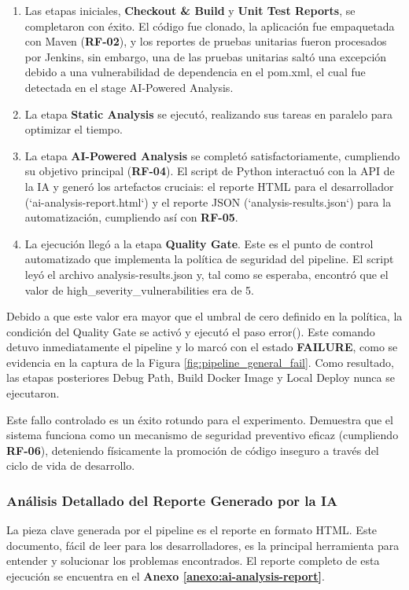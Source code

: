 \begin{enumerate}
    \item Las etapas iniciales, \textbf{Checkout \& Build} y \textbf{Unit Test Reports}, se completaron con éxito. El código fue clonado, la aplicación fue empaquetada con Maven (\textbf{RF-02}), y los reportes de pruebas unitarias fueron procesados por Jenkins, sin embargo, una de las pruebas unitarias saltó una excepción debido a una vulnerabilidad de dependencia en el pom.xml, el cual fue detectada en el stage AI-Powered Analysis.
    \item La etapa \textbf{Static Analysis} se ejecutó, realizando sus tareas en paralelo para optimizar el tiempo.
    \item La etapa \textbf{AI-Powered Analysis} se completó satisfactoriamente, cumpliendo su objetivo principal (\textbf{RF-04}). El script de Python interactuó con la API de la IA y generó los artefactos cruciais: el reporte HTML para el desarrollador (`ai-analysis-report.html`) y el reporte JSON (`analysis-results.json`) para la automatización, cumpliendo así con \textbf{RF-05}.
    \item La ejecución llegó a la etapa \textbf{Quality Gate}. Este es el punto de control automatizado que implementa la política de seguridad del pipeline. El script leyó el archivo analysis-results.json y, tal como se esperaba, encontró que el valor de high\_severity\_vulnerabilities era de 5. 
\end{enumerate}

Debido a que este valor era mayor que el umbral de cero definido en la política, la condición del Quality Gate se activó y ejecutó el paso error(). Este comando detuvo inmediatamente el pipeline y lo marcó con el estado \textbf{FAILURE}, como se evidencia en la captura de la Figura \ref{fig:pipeline_general_fail}. Como resultado, las etapas posteriores Debug Path, Build Docker Image y Local Deploy nunca se ejecutaron.

Este fallo controlado es un éxito rotundo para el experimento. Demuestra que el sistema funciona como un mecanismo de seguridad preventivo eficaz (cumpliendo \textbf{RF-06}), deteniendo físicamente la promoción de código inseguro a través del ciclo de vida de desarrollo.

\subsubsection{Análisis Detallado del Reporte Generado por la IA}
La pieza clave generada por el pipeline es el reporte en formato HTML. Este documento, fácil de leer para los desarrolladores, es la principal herramienta para entender y solucionar los problemas encontrados. El reporte completo de esta ejecución se encuentra en el \textbf{Anexo \ref{anexo:ai-analysis-report}}.

